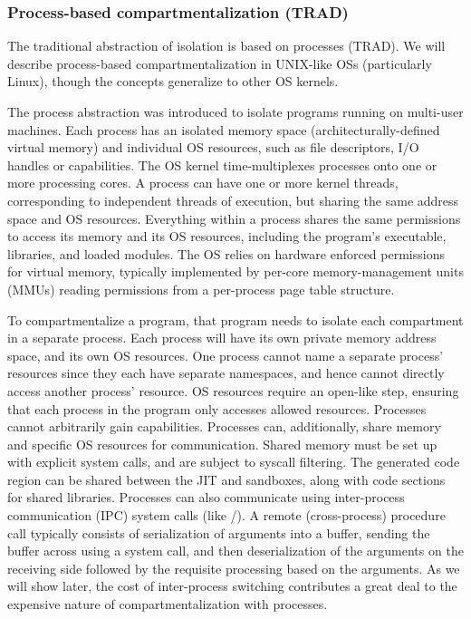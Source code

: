\subsubsection{Process-based compartmentalization (TRAD)}
The traditional abstraction of isolation is based on processes (TRAD).
We will describe process-based compartmentalization in UNIX-like OSs
(particularly Linux), 
though the concepts generalize to other OS kernels.

The process abstraction was introduced to isolate programs running on 
multi-user machines.
Each process has an isolated memory space (architecturally-defined virtual memory)
and individual OS resources, such as file descriptors, I/O handles or capabilities.
The OS kernel time-multiplexes processes onto one or more processing cores.
A process can have one or more kernel threads, corresponding to independent threads
of execution, but sharing the same address space and OS resources.
Everything within a process shares the same permissions to access its memory and
its OS resources, including the program's executable, libraries, and loaded modules.
The OS relies on hardware enforced permissions for virtual memory, typically 
implemented by per-core memory-management units (MMUs) reading permissions from a
per-process page table structure.

To compartmentalize a program, that program needs to isolate each compartment in
a separate process.
Each process will have its own private memory address space, and its own 
OS resources.
One process cannot name a separate process' resources since they each have separate
namespaces, and hence cannot directly access another process' resource.
OS resources require an open-like step, ensuring that each process in the program
only accesses allowed resources.
Processes cannot arbitrarily gain capabilities.
Processes can, additionally, share memory and specific OS resources for 
communication.
Shared memory must be set up with explicit system calls, and are subject to 
syscall filtering.
The generated code region can be shared between the JIT and sandboxes, along
with code sections for shared libraries.
Processes can also communicate using inter-process communication (IPC) system 
calls (like /).
A remote (cross-process) procedure call typically consists of serialization of
arguments into a buffer, sending the buffer across using a system call,
and then deserialization of the arguments on the receiving side followed by
the requisite processing based on the arguments.
As we will show later, the cost of inter-process switching contributes a great
deal to the expensive nature of compartmentalization with processes.

